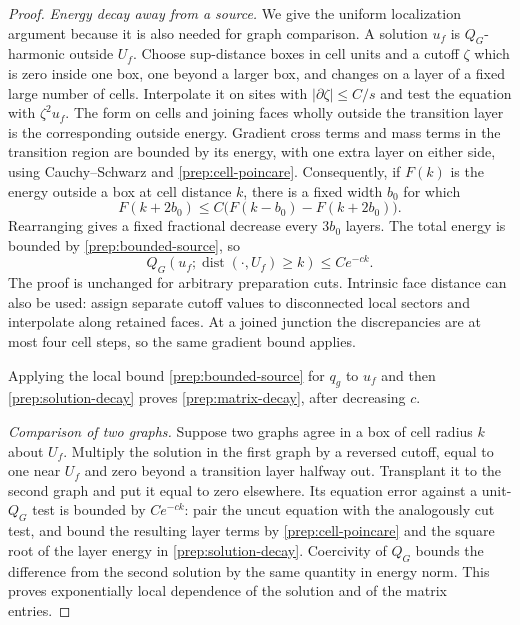 \begin{proof}
\emph{Energy decay away from a source.}
We give the uniform localization argument because it is also needed for
graph comparison.  A solution $u_f$ is $Q_G$-harmonic outside $U_f$.
Choose sup-distance boxes in cell units and a cutoff $\zeta$ which is
zero inside one box, one beyond a larger box, and changes on a layer of
a fixed large number of cells.  Interpolate it on sites with
$|\partial\zeta|\le C/s$ and test the equation with $\zeta^2u_f$.
The form on cells and joining faces wholly outside the transition layer
is the corresponding outside energy.  Gradient cross terms and mass
terms in the transition region are bounded by its energy, with one
extra layer on either side, using Cauchy--Schwarz and
\eqref{prep:cell-poincare}.  Consequently, if $F(k)$ is the energy outside
a box at cell distance $k$, there is a fixed width $b_0$ for which
\[
 F(k+2b_0)\le C\bigl(F(k-b_0)-F(k+2b_0)\bigr).
\]
Rearranging gives a fixed fractional decrease every $3b_0$ layers.
The total energy is bounded by \eqref{prep:bounded-source}, so
\begin{equation}\label{prep:solution-decay}
                    Q_G(u_f;\operatorname{dist}(\cdot,U_f)\ge k)
                                          \le Ce^{-ck}.
\end{equation}
The proof is unchanged for arbitrary preparation cuts.  Intrinsic face
distance can also be used: assign separate cutoff values to disconnected
local sectors and interpolate along retained faces.  At a joined
junction the discrepancies are at most four cell steps, so the same
gradient bound applies.

Applying the local bound \eqref{prep:bounded-source} for $q_g$ to
$u_f$ and then \eqref{prep:solution-decay} proves
\eqref{prep:matrix-decay}, after decreasing $c$.

\emph{Comparison of two graphs.}
Suppose two graphs agree in a box of cell radius $k$ about $U_f$.
Multiply the solution in the first graph by a reversed cutoff, equal to
one near $U_f$ and zero beyond a transition layer halfway out.  Transplant
it to the second graph and put it equal to zero elsewhere.  Its equation
error against a unit-$Q_G$ test is bounded by $Ce^{-ck}$: pair the uncut
equation with the analogously cut test, and bound the resulting layer
terms by \eqref{prep:cell-poincare} and the square root of the layer
energy in \eqref{prep:solution-decay}.  Coercivity of $Q_G$ bounds the
difference from the second solution by the same quantity in energy
norm.  This proves exponentially local dependence of the solution and
of the matrix entries.


\end{proof}
